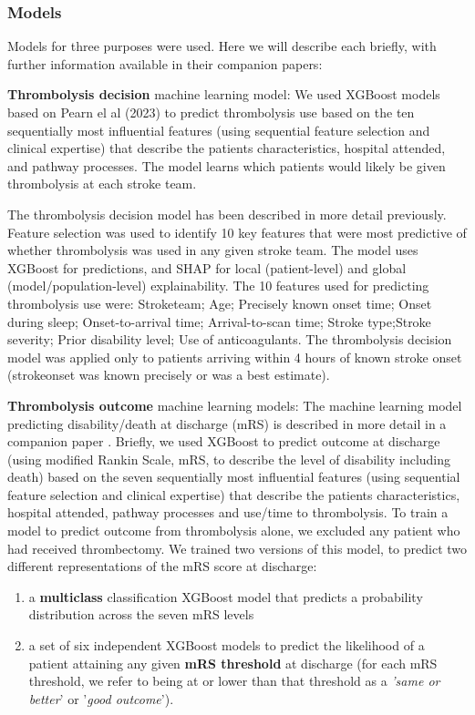 \subsubsection{Models}

Models for three purposes were used. Here we will describe each briefly, with further information available in their companion papers:

\textbf{Thrombolysis decision} machine learning model: We used XGBoost \cite{chen_xgboost_2016} models based on Pearn el al (2023) \cite{pearn_what_2023} to predict thrombolysis use based on the ten sequentially most influential features (using sequential feature selection and clinical expertise) that describe the patients characteristics, hospital attended, and pathway processes. The model learns which patients would likely be given thrombolysis at each stroke team.


The thrombolysis decision model has been described in more detail previously\cite{pearn_what_2023}. Feature selection was used to identify 10 key features that were most predictive of whether thrombolysis was used in any given stroke team. The model uses XGBoost for predictions, and SHAP for local (patient-level) and global (model/population-level) explainability. The 10 features used for predicting thrombolysis use were: Stroketeam; Age; Precisely known onset time; Onset during sleep; Onset-to-arrival time; Arrival-to-scan time; Stroke type;Stroke severity; Prior disability level; Use of anticoagulants. The thrombolysis decision model was applied only to patients arriving within 4 hours of known stroke onset (strokeonset was known precisely or was a best estimate). 

\textbf{Thrombolysis outcome} machine learning models: The machine learning model predicting disability/death at discharge (mRS) is described in more detail in a companion paper \cite{pearn_are_2024}. Briefly, we used XGBoost \cite{chen_xgboost_2016} to predict outcome at discharge (using modified Rankin Scale, mRS, to describe the level of disability including death) based on the seven sequentially most influential features (using sequential feature selection and clinical expertise) that describe the patients characteristics, hospital attended, pathway processes and use/time to thrombolysis. To train a model to predict outcome from thrombolysis alone, we excluded any patient who had received thrombectomy. We trained two versions of this model, to predict two different representations of the mRS score at discharge: 
\begin{enumerate}
    \item a \textbf{multiclass} classification XGBoost model that predicts a probability distribution across the seven mRS levels
    \item a set of six independent XGBoost models to predict the likelihood of a patient attaining any given \textbf{mRS threshold} at discharge (for each mRS threshold, we refer to being at or lower than that threshold as a \textit{'same or better}' or '\textit{good outcome}'). 
\end{enumerate}

